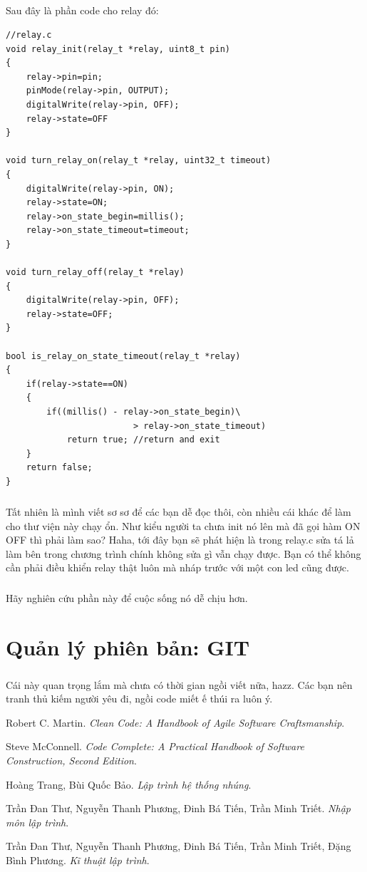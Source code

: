\documentclass[12pt,a5paper]{book}
\begin{document}
\paragraph{}
Sau đây là phần code cho relay đó:
\begin{lstlisting}
//relay.c
void relay_init(relay_t *relay, uint8_t pin)
{
	relay->pin=pin;
	pinMode(relay->pin, OUTPUT);
	digitalWrite(relay->pin, OFF);
	relay->state=OFF
}

void turn_relay_on(relay_t *relay, uint32_t timeout)
{
	digitalWrite(relay->pin, ON);
	relay->state=ON;
	relay->on_state_begin=millis();
	relay->on_state_timeout=timeout;
}

void turn_relay_off(relay_t *relay)
{
	digitalWrite(relay->pin, OFF);
	relay->state=OFF;
}

bool is_relay_on_state_timeout(relay_t *relay)
{
	if(relay->state==ON) 
	{
		if((millis() - relay->on_state_begin)\
						 > relay->on_state_timeout)
			return true; //return and exit
	}
	return false;
}

\end{lstlisting}
\paragraph{}
Tất nhiên là mình viết sơ sơ để các bạn dễ đọc thôi, còn nhiều cái khác để làm cho thư viện này chạy ổn. Như kiểu người ta chưa init nó lên mà đã gọi hàm ON OFF thì phải làm sao? Haha, tới đây bạn sẽ phát hiện là trong relay.c sửa tá lả làm bên trong chương trình chính không sửa gì vẫn chạy được. Bạn có thể không cần phải điều khiển relay thật luôn mà nháp trước với một con led cũng được.
\paragraph{}
Hãy nghiên cứu phần này để cuộc sống nó dễ chịu hơn.
\chapter{Quản lý phiên bản: GIT}
\paragraph{}
Cái này quan trọng lắm mà chưa có thời gian ngồi viết nữa, hazz. Các bạn nên tranh thủ kiếm người yêu đi, ngồi code miết ế thúi ra luôn ý.
\newpage


\begin{thebibliography}{9}
Robert C. Martin. 
\textit{Clean Code: A Handbook of Agile Software Craftsmanship}. 
 
Steve McConnell.
\textit{Code Complete: A Practical Handbook of Software Construction, Second Edition}.

Hoàng Trang, Bùi Quốc Bảo.
\textit{Lập trình hệ thống nhúng}.

Trần Đan Thư, Nguyễn Thanh Phương, Đinh Bá Tiến, Trần Minh Triết.
\textit{Nhập môn lập trình}.

Trần Đan Thư, Nguyễn Thanh Phương, Đinh Bá Tiến, Trần Minh Triết, Đặng Bình Phương.
\textit{Kĩ thuật lập trình}.

\end{thebibliography}
\end{document}
